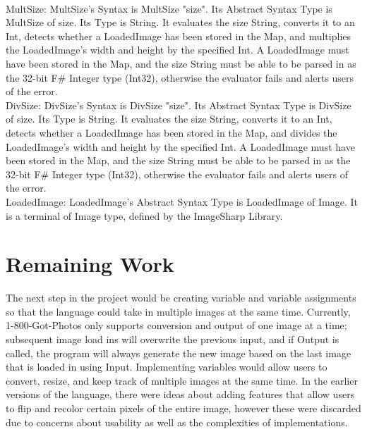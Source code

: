 \documentclass{article}
\begin{document}
\\MultSize: MultSize's Syntax is MultSize "size". Its Abstract Syntax Type is MultSize of size. Its Type is String. It evaluates the size String, converts it to an Int, detects whether a LoadedImage has been stored in the Map, and multiplies the LoadedImage's width and height by the specified Int. A LoadedImage must have been stored in the Map, and the size String must be able to be parsed in as the 32-bit F\# Integer type (Int32), otherwise the evaluator fails and alerts users of the error.
\\DivSize: DivSize's Syntax is DivSize "size". Its Abstract Syntax Type is DivSize of size. Its Type is String. It evaluates the size String, converts it to an Int, detects whether a LoadedImage has been stored in the Map, and divides the LoadedImage's width and height by the specified Int. A LoadedImage must have been stored in the Map, and the size String must be able to be parsed in as the 32-bit F\#  Integer type (Int32), otherwise the evaluator fails and alerts users of the error.
\\LoadedImage: LoadedImage's Abstract Syntax Type is LoadedImage of Image. It is a terminal of Image type, defined by the ImageSharp Library. 

\section{Remaining Work}
The next step in the project would be creating variable and variable assignments so that the language could take in multiple images at the same time. Currently, 1-800-Got-Photos only supports conversion and output of one image at a time; subsequent image load ins will overwrite the previous input, and if Output is called, the program will always generate the new image based on the last image that is loaded in using Input. Implementing variables would allow users to convert, resize, and keep track of multiple images at the same time. In the earlier versions of the language, there were ideas about adding features that allow users to flip and recolor certain pixels of the entire image, however these were discarded due to concerns about usability as well as the complexities of implementations. 
\end{document}
